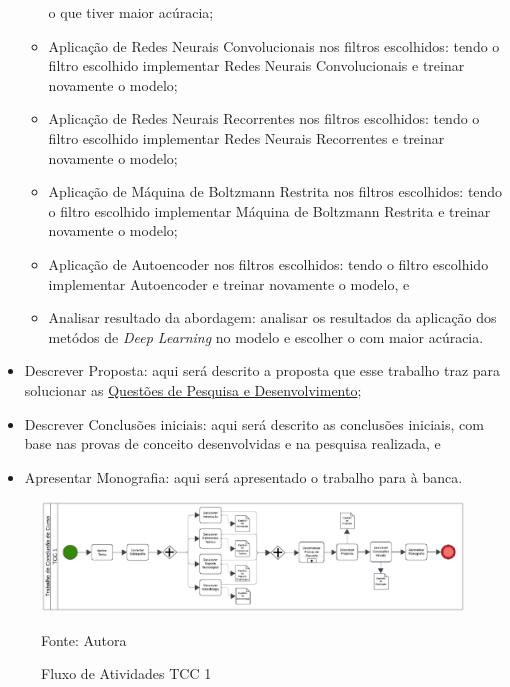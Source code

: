 \begin{itemize}
\begin{itemize}
        o que tiver maior acúracia;
        \item Aplicação de Redes Neurais Convolucionais nos filtros escolhidos: tendo o filtro escolhido implementar 
        Redes Neurais Convolucionais e treinar novamente o modelo;
        \item Aplicação de Redes Neurais Recorrentes nos filtros escolhidos: tendo o filtro escolhido implementar 
        Redes Neurais Recorrentes e treinar novamente o modelo;
        \item Aplicação de Máquina de Boltzmann Restrita nos filtros escolhidos: tendo o filtro escolhido implementar 
        Máquina de Boltzmann Restrita e treinar novamente o modelo;
        \item Aplicação de Autoencoder nos filtros escolhidos: tendo o filtro escolhido implementar 
        Autoencoder e treinar novamente o modelo, e
        \item Analisar resultado da abordagem: analisar os resultados da aplicação dos metódos de \textit{Deep Learning}
        no modelo e escolher o com maior acúracia.
    \end{itemize}
\item Descrever Proposta: aqui será descrito a proposta que esse trabalho traz para solucionar as 
\hyperref[sec:questaopesquisa]{Questões de Pesquisa e Desenvolvimento};
\item Descrever Conclusões iniciais: aqui será descrito as conclusões iniciais, com base nas provas de conceito desenvolvidas
e na pesquisa realizada, e
\item Apresentar Monografia: aqui será apresentado o trabalho para à banca.
\end{itemize}

\begin{figure}[H]
    \centering
    \caption{Fluxo de Atividades TCC 1}
    \label{fig:bpmnTcc1}
    
    \vspace{2pt} %
    
    \includegraphics[width=1.0\textwidth]{figuras/bpmnTcc1.eps}
    
    \vspace{2pt} %
    
    \small Fonte: Autora
\end{figure}


